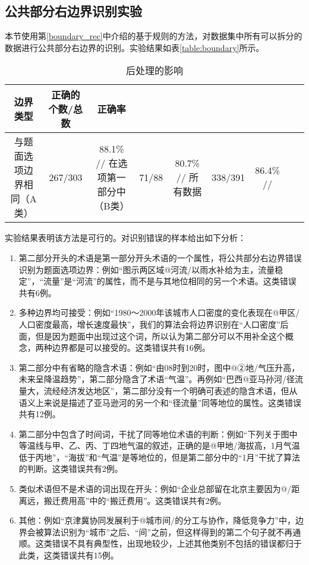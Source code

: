 \documentclass[master, winfont]{njuthesis}
\begin{document}
\subsection{公共部分右边界识别实验}
本节使用第\ref{boundary_rec}中介绍的基于规则的方法，对数据集中所有可以拆分的数据进行公共部分右边界的识别。实验结果如表\ref{table:boundary}所示。
\begin{table}
\begin{center}
\begin{tabular}{c|c|c|c|c|c|c|c|c}
\hline {边界类型} & {正确的个数/总数} & {正确率}  \\
\hline 与题面选项边界相同（A类） & 267/303 & 88.1\% //
\hline 在选项第一部分中（B类） & 71/88 & 80.7\% //
\hline 所有数据	& 338/391 & 86.4\% //
\hline
\end{tabular}
\end{center}
\caption{\label{table:postprocess} 后处理的影响}
\end{table}

实验结果表明该方法是可行的。对识别错误的样本给出如下分析：
\begin{enumerate}
	\item 第二部分开头的术语是第一部分开头术语的一个属性，将公共部分右边界错误识别为题面选项边界：例如“图示两区域@河流/以雨水补给为主，流量稳定”，“流量”是“河流”的属性，而不是与其地位相同的另一个术语。这类错误共有6例。
	\item 多种边界均可接受：例如“1980〜2000年该城市人口密度的变化表现在@甲区/人口密度最高，增长速度最快”，我们的算法会将边界识别在“人口密度”后面，但是因为题面中出现过这个词，所以认为第二部分可以不用补全这个概念，两种边界都是可以接受的。这类错误共有16例。
	\item 第二部分中有省略的隐含术语：例如“由08时到20时，图中@②地/气压升高，未来呈降温趋势”，第二部分隐含了术语“气温”。再例如“巴西@亚马孙河/径流量大，流经经济发达地区”，第二部分没有一个明确可表述的隐含术语，但从语义上来说是描述了亚马逊河的另一个和“径流量”同等地位的属性。这类错误共有12例。
	\item 第二部分中包含了时间词，干扰了同等地位术语的判断：例如“下列关于图中等温线与甲、乙、丙、丁四地气温的叙述，正确的是@甲地/海拔高，1月气温低于丙地”，“海拔”和“气温”是等地位的，但是第二部分中的“1月”干扰了算法的判断。这类错误共有2例。
	\item 类似术语但不是术语的词出现在开头：例如“企业总部留在北京主要因为@/距离远，搬迁费用高”中的“搬迁费用”。这类错误共有2例。
	\item 其他：例如“京津冀协同发展利于@城市间/的分工与协作，降低竞争力”中，边界会被算法识别为“城市”之后、“间”之前，但这样得到的第二个句子就不再通顺。这类错误不具有典型性，出现地较少，上述其他类别不包括的错误都归于此类，这类错误共有15例。
\end{enumerate}
\end{document}
